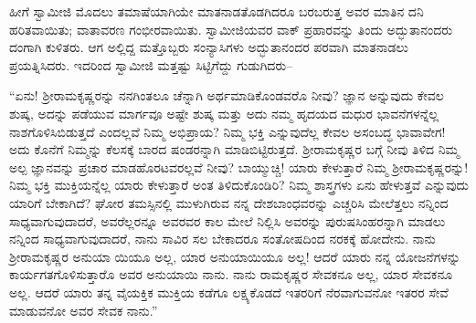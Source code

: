 ಹೀಗೆ ಸ್ವಾಮೀಜಿ ಮೊದಲು ತಮಾಷೆಯಾಗಿಯೇ ಮಾತನಾಡತೊಡಗಿದರೂ ಬರಬರುತ್ತ ಅವರ ಮಾತಿನ ದನಿ ಹರಿತವಾಯಿತು; ವಾತಾವರಣ ಗಂಭೀರವಾಯಿತು. ಸ್ವಾಮೀಜಿಯವರ ವಾಕ್ ಪ್ರಹಾರವನ್ನು ತಿಂದು ಅದ್ಭುತಾನಂದರು ದಂಗಾಗಿ ಕುಳಿತರು. ಆಗ ಅಲ್ಲಿದ್ದ ಮತ್ತೊಬ್ಬರು ಸಂನ್ಯಾಸಿಗಳು ಅದ್ಭುತಾನಂದರ ಪರವಾಗಿ ಮಾತನಾಡಲು ಪ್ರಯತ್ನಿಸಿದರು. ಇದರಿಂದ ಸ್ವಾಮೀಜಿ ಮತ್ತಷ್ಟು ಸಿಟ್ಟಿಗೆದ್ದು ಗುಡುಗಿದರು–

“ಏನು! ಶ್ರೀರಾಮಕೃಷ್ಣರನ್ನು ನನಗಿಂತಲೂ ಚೆನ್ನಾಗಿ ಅರ್ಥಮಾಡಿಕೊಂಡವರೊ ನೀವು? ಜ್ಞಾನ ಅನ್ನುವುದು ಕೇವಲ ಶುಷ್ಕ, ಅದನ್ನು ಪಡೆಯುವ ಮಾರ್ಗವೂ ಅಷ್ಟೇ ಶುಷ್ಕ ಮತ್ತು ಅದು ನಮ್ಮ ಹೃದಯದ ಮಧುರ ಭಾವನೆಗಳನ್ನೆಲ್ಲ ನಾಶಗೊಳಿಸಿಬಿಡುತ್ತದೆ ಎಂದಲ್ಲವೆ ನಿಮ್ಮ ಅಭಿಪ್ರಾಯ? ನಿಮ್ಮ ಭಕ್ತಿ ಎನ್ನುವುದೆಲ್ಲ ಕೇವಲ ಅಸಂಬದ್ಧ ಭಾವಾವೇಗ! ಅದು ಕೊನೆಗೆ ನಿಮ್ಮನ್ನು ಕೆಲಸಕ್ಕೆ ಬಾರದ ಷಂಡರನ್ನಾಗಿ ಮಾಡಿಬಿಟ್ಟಿರುತ್ತದೆ. ಶ್ರೀರಾಮಕೃಷ್ಣರ ಬಗ್ಗೆ ನೀವು ತಿಳಿದ ನಿಮ್ಮ ಅಲ್ಪ ಜ್ಞಾನವನ್ನು ಪ್ರಚಾರ ಮಾಡಹೊರಟವರಲ್ಲವೆ ನೀವು? ಬಾಯ್ಮುಚ್ಚಿ! ಯಾರು ಕೇಳುತ್ತಾರೆ ನಿಮ್ಮ ಶ್ರೀರಾಮಕೃಷ್ಣರನ್ನು! ನಿಮ್ಮ ಭಕ್ತಿ ಮುಕ್ತಿಯನ್ನೆಲ್ಲ ಯಾರು ಕೇಳುತ್ತಾರೆ ಅಂತ ತಿಳಿದುಕೊಂಡಿರಿ? ನಿಮ್ಮ ಶಾಸ್ತ್ರಗಳು ಏನು ಹೇಳುತ್ತವೆ ಎನ್ನುವುದು ಯಾರಿಗೆ ಬೇಕಾಗಿದೆ? ಘೋರ ತಮಸ್ಸಿನಲ್ಲಿ ಮುಳುಗಿರುವ ನನ್ನ ದೇಶಬಾಂಧವರನ್ನು ಎಚ್ಚರಿಸಿ ಮೇಲೆತ್ತಲು ನನ್ನಿಂದ ಸಾಧ್ಯವಾಗುವುದಾದರೆ, ಅವರೆಲ್ಲರನ್ನೂ ಅವರವರ ಕಾಲ ಮೇಲೆ ನಿಲ್ಲಿಸಿ ಅವರನ್ನು ಪುರುಷಸಿಂಹರನ್ನಾಗಿ ಮಾಡಲು ನನ್ನಿಂದ ಸಾಧ್ಯವಾಗುವುದಾದರೆ, ನಾನು ಸಾವಿರ ಸಲ ಬೇಕಾದರೂ ಸಂತೋಷದಿಂದ ನರಕಕ್ಕೆ ಹೋದೇನು. ನಾನು ಶ್ರೀರಾಮಕೃಷ್ಣರ ಅನುಯಾ ಯಿಯೂ ಅಲ್ಲ, ಯಾರ ಅನುಯಾಯಿಯೂ ಅಲ್ಲ! ಆದರೆ ಯಾರು ನನ್ನ ಯೋಜನೆಗಳನ್ನು ಕಾರ್ಯಗತಗೊಳಿಸುತ್ತಾರೊ ಅವರ ಅನುಯಾಯಿ ನಾನು. ನಾನು ರಾಮಕೃಷ್ಣರ ಸೇವಕನೂ ಅಲ್ಲ, ಯಾರ ಸೇವಕನೂ ಅಲ್ಲ. ಆದರೆ ಯಾರು ತನ್ನ ವೈಯಕ್ತಿಕ ಮುಕ್ತಿಯ ಕಡೆಗೂ ಲಕ್ಷ್ಯಕೊಡದೆ ಇತರರಿಗೆ ನೆರವಾಗುವನೋ ಇತರರ ಸೇವೆ ಮಾಡುವನೋ ಅವರ ಸೇವಕ ನಾನು.”


